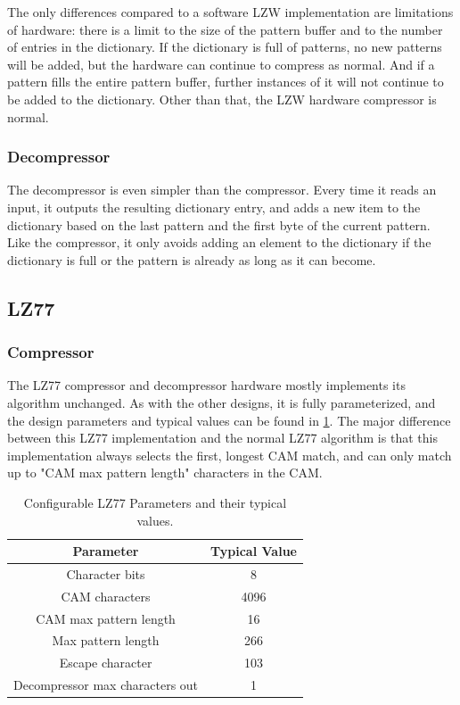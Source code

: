 \documentclass[doublespace,nopageskip]{VTthesis}
\begin{document}
The only differences compared to a software LZW implementation are limitations of hardware: there is a limit to the size of the pattern buffer and to the number of entries in the dictionary. If the dictionary is full of patterns, no new patterns will be added, but the hardware can continue to compress as normal. And if a pattern fills the entire pattern buffer, further instances of it will not continue to be added to the dictionary. Other than that, the LZW hardware compressor is normal.

\subsubsection{Decompressor}\label{sss:decompressor}
The decompressor is even simpler than the compressor. Every time it reads an input, it outputs the resulting dictionary entry, and adds a new item to the dictionary based on the last pattern and the first byte of the current pattern. Like the compressor, it only avoids adding an element to the dictionary if the dictionary is full or the pattern is already as long as it can become.

\subsection{LZ77}\label{ss:lz77}
\subsubsection{Compressor}\label{sss:compressor}
The LZ77 compressor and decompressor hardware mostly implements its algorithm unchanged. As with the other designs, it is fully parameterized, and the design parameters and typical values can be found in \ref{tab:lz77-configuration-table}. The major difference between this LZ77 implementation and the normal LZ77 algorithm is that this implementation always selects the first, longest CAM match, and can only match up to "CAM max pattern length" characters in the CAM.

\begin{table}[htb]
	\centering
	\caption{Configurable LZ77 Parameters and their typical values.}
	\begin{tabular}{|c|c|}
	    \hline
	    Parameter & Typical Value \\
	    \hline
	    Character bits & 8 \\
	    \hline
	    CAM characters & 4096 \\
	    \hline
	    CAM max pattern length & 16 \\
	    \hline
	    Max pattern length & 266 \\ 
	    \hline
	    Escape character & 103 \\ 
	    \hline
	    Decompressor max characters out & 1\\
	    \hline
	\end{tabular}
	\label{tab:lz77-configuration-table}
\end{table}
\end{document}
